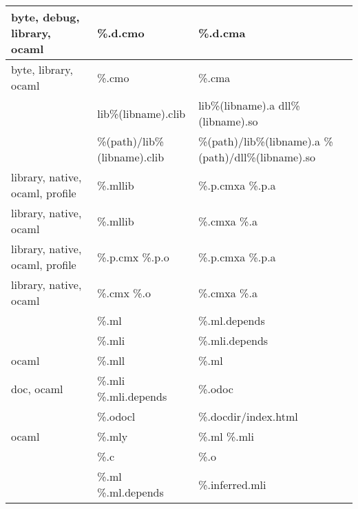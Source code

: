 \documentclass[12pt]{article}
\begin{document}
\begin{center}
\begin{tabular}{|l|l|p{5cm}|}
  \hline
   byte, debug, library, ocaml &  \%.d.cmo  &  \%.d.cma  \\
  \hline
   byte, library, ocaml &  \%.cmo  &  \%.cma  \\
  \hline
    & lib\%(libname).clib & lib\%(libname).a dll\%(libname).so  \\
  \hline
    & \%(path)/lib\%(libname).clib & \%(path)/lib\%(libname).a \%(path)/dll\%(libname).so \\
  \hline
   library, native, ocaml, profile & \%.mllib  &  \%.p.cmxa \%.p.a  \\
  \hline
   library, native, ocaml &  \%.mllib  & \%.cmxa \%.a  \\
  \hline
   library, native, ocaml, profile & \%.p.cmx \%.p.o  &  \%.p.cmxa \%.p.a  \\
  \hline
   library, native, ocaml &  \%.cmx \%.o  & \%.cmxa \%.a  \\
  \hline
    &  \%.ml  &  \%.ml.depends  \\
  \hline
    &  \%.mli  &  \%.mli.depends  \\
  \hline
   ocaml &  \%.mll  &  \%.ml  \\
  \hline
   doc, ocaml &  \%.mli \%.mli.depends  &  \%.odoc  \\
  \hline
    &  \%.odocl  & \%.docdir/index.html \\
  \hline
   ocaml &  \%.mly  &  \%.ml \%.mli  \\
  \hline
    &  \%.c  &  \%.o  \\
  \hline
    &  \%.ml \%.ml.depends  & \%.inferred.mli  \\
  \hline
\end{tabular}
\end{center}
\end{document}
